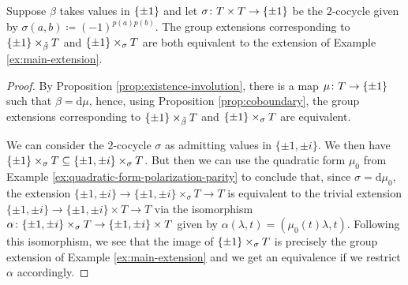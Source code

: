 \begin{lemma}\label{lemma:tildeT-finally}
    Suppose $\beta$ takes values in $\{ \pm 1 \}$ and let $\sigma\colon T\times T \to \{ \pm 1 \}$ be the $2$-cocycle given by $\sigma(a,b) \coloneqq (-1)^{p(a)p(b)}$. 
    The group extensions corresponding to $\{ \pm 1 \} \times_{\tilde\beta} T$ and $\{ \pm 1 \} \times_\sigma T$ are both equivalent to the extension of Example 
    \ref{ex:main-extension}. 
\end{lemma}

\begin{proof}
    By Proposition \ref{prop:existence-involution}, there is a map $\mu\colon T \to \{\pm 1\}$ such that $\beta = \mathrm{d}\mu$, hence, using Proposition \ref{prop:coboundary}, the group extensions corresponding to $\{ \pm 1 \} \times_{\tilde\beta} T$ and $\{ \pm 1 \} \times_\sigma T$ are equivalent. 
    
    We can consider the $2$-cocycle $\sigma$ as admitting values in $\{\pm 1, \pm i\}$. 
    We then have $\{ \pm 1 \} \times_\sigma T \subseteq \{\pm 1, \pm i\} \times_\sigma T$. 
    But then we can use the quadratic form $\mu_0$ from Example \ref{ex:quadratic-form-polarization-parity} to conclude that, since $\sigma = \mathrm{d} \mu_0$, the extension $\{\pm 1, \pm i\} \to \{\pm 1, \pm i\} \times_\sigma T \to T$ is equivalent to the trivial extension $\{\pm 1, \pm i\} \to \{\pm 1, \pm i\} \times T \to T$ via the isomorphism $\alpha\colon \{\pm 1, \pm i\} \times_\sigma T \to \{\pm 1, \pm i\} \times T$ given by $\alpha(\lambda, t) = (\mu_0(t) \lambda, t)$. 
    Following this isomorphism, we see that the image of $\{ \pm 1 \} \times_\sigma T$ is precisely the group extension of Example \ref{ex:main-extension} and we get an equivalence if we restrict $\alpha$ accordingly.
\end{proof}







